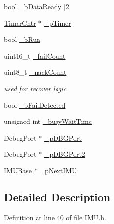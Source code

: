 \begin{DoxyCompactItemize}
bool \hyperlink{class_i_m_u_a8a71f0728b2d849d1d8e54fcb58aad4e}{\_\-bDataReady} \mbox{[}2\mbox{]}
\item 
\hyperlink{class_timer_cntr}{TimerCntr} $\ast$ \hyperlink{class_i_m_u_a16e73b1457a346aed16d4b61fae7f2c4}{\_\-pTimer}
\item 
bool \hyperlink{class_i_m_u_a547fe1fb8adb34917aa08663919b97df}{\_\-bRun}
\item 
uint16\_\-t \hyperlink{class_i_m_u_a1e646aa38b84721fc650ef5d3388cc14}{\_\-failCount}
\item 
uint8\_\-t \hyperlink{class_i_m_u_a30c8553ab21b5d6e618c2616f25dafb1}{\_\-nackCount}
\begin{DoxyCompactList}\small\item\em used for recover logic \item\end{DoxyCompactList}\item 
bool \hyperlink{class_i_m_u_a12238a84e20f54c5fe799e0b37feb0ea}{\_\-bFailDetected}
\item 
unsigned int \hyperlink{class_i_m_u_adce31ce2a3317918d73b47e94a2d9227}{\_\-busyWaitTime}
\item 
DebugPort $\ast$ \hyperlink{class_i_m_u_a83a2ffaf84cc04f17ff0301181c45366}{\_\-pDBGPort}
\item 
DebugPort $\ast$ \hyperlink{class_i_m_u_a1cf5672a28049d5885a2958010188928}{\_\-pDBGPort2}
\item 
\hyperlink{class_i_m_u_base}{IMUBase} $\ast$ \hyperlink{class_i_m_u_a72d5aa462d6627b458db76ca6567d130}{\_\-pNextIMU}
\end{DoxyCompactItemize}


\subsection{Detailed Description}


Definition at line 40 of file IMU.h.



